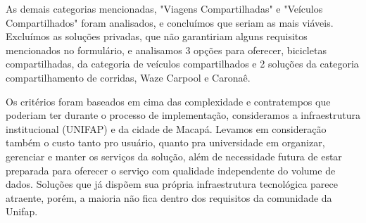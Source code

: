 As demais categorias mencionadas, "Viagens Compartilhadas" e "Veículos Compartilhados" foram analisados, e concluímos que seriam as mais viáveis. Excluímos as soluções privadas, que não garantiriam alguns requisitos mencionados no formulário, e analisamos 3 opções para oferecer, bicicletas compartilhadas, da categoria de veículos compartilhados e 2 soluções da categoria compartilhamento de corridas, Waze Carpool e Caronaê.

Os critérios foram baseados em cima das complexidade e contratempos que poderiam ter durante o processo de implementação, consideramos a infraestrutura institucional (UNIFAP) e da cidade de Macapá. Levamos em consideração também o custo tanto pro usuário, quanto pra universidade em organizar, gerenciar e manter os serviços da solução, além de necessidade futura de estar preparada para oferecer o serviço com qualidade independente do volume de dados. Soluções que já dispõem sua própria infraestrutura tecnológica parece atraente, porém, a maioria não fica dentro dos requisitos da comunidade da Unifap.


